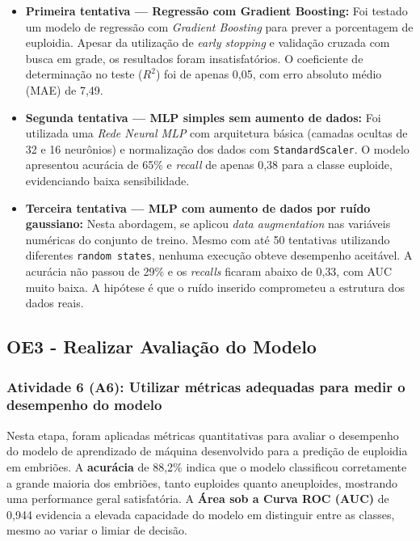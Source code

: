 \begin{itemize}
    \item \textbf{Primeira tentativa — Regressão com Gradient Boosting:} Foi testado um modelo de regressão com \textit{Gradient Boosting} para prever a porcentagem de euploidia. Apesar da utilização de \textit{early stopping} e validação cruzada com busca em grade, os resultados foram insatisfatórios. O coeficiente de determinação no teste ($R^2$) foi de apenas 0{,}05, com erro absoluto médio (MAE) de 7{,}49.

    \item \textbf{Segunda tentativa — MLP simples sem aumento de dados:} Foi utilizada uma \textit{Rede Neural MLP} com arquitetura básica (camadas ocultas de 32 e 16 neurônios) e normalização dos dados com \texttt{StandardScaler}. O modelo apresentou acurácia de 65\% e \textit{recall} de apenas 0{,}38 para a classe euploide, evidenciando baixa sensibilidade. 

    \item \textbf{Terceira tentativa — MLP com aumento de dados por ruído gaussiano:} Nesta abordagem, se aplicou \textit{data augmentation} nas variáveis numéricas do conjunto de treino. Mesmo com até 50 tentativas utilizando diferentes \texttt{random states}, nenhuma execução obteve desempenho aceitável. A acurácia não passou de 29\% e os \textit{recalls} ficaram abaixo de 0{,}33, com AUC muito baixa. A hipótese é que o ruído inserido comprometeu a estrutura dos dados reais.
\end{itemize}

\subsection{OE3 - Realizar Avaliação do Modelo}
\subsubsection{Atividade 6 (A6): Utilizar métricas adequadas para medir o desempenho do modelo}
Nesta etapa, foram aplicadas métricas quantitativas para avaliar o desempenho do modelo de aprendizado de máquina desenvolvido para a predição de euploidia em embriões. A \textbf{acurácia} de 88,2\% indica que o modelo classificou corretamente a grande maioria dos embriões, tanto euploides quanto aneuploides, mostrando uma performance geral satisfatória. A \textbf{Área sob a Curva ROC (AUC)} de 0,944 evidencia a elevada capacidade do modelo em distinguir entre as classes, mesmo ao variar o limiar de decisão. 

